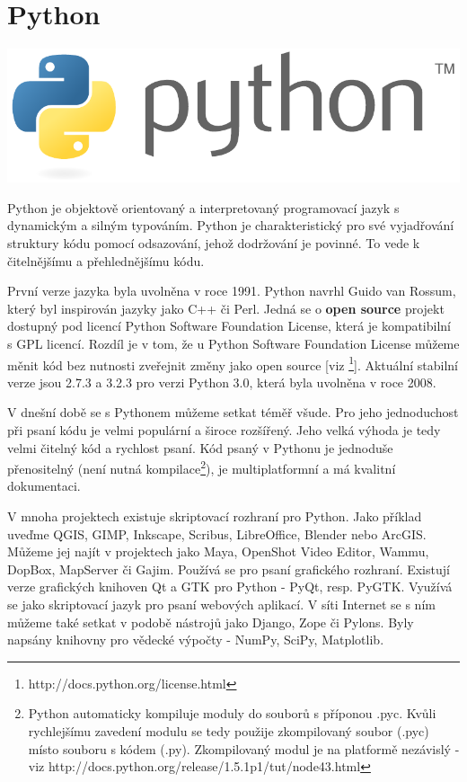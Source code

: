 \newpage
\section{Python}
\nocite{py3:book}


\begin{center}
	\includegraphics[scale=0.5]{pictures/python/logo.pdf}
\end{center}

Python je objektově orientovaný a interpretovaný programovací jazyk s
dynamickým a silným typováním. Python je charakteristický pro své
vyjadřování struktury kódu pomocí odsazování, jehož dodržování je
povinné. To vede k čitelnějšímu a přehlednějšímu kódu.

První verze jazyka byla uvolněna v roce 1991. Python navrhl Guido van
Rossum, který byl inspirován jazyky jako C++ či Perl. Jedná se
o \textbf{open source} projekt dostupný pod licencí Python Software
Foundation License, která je kompatibilní s GPL licencí. Rozdíl je v
tom, že u Python Software Foundation License můžeme měnit kód bez
nutnosti zveřejnit změny jako open source
[viz \footnote{http://docs.python.org/license.html}]. Aktuální
stabilní verze jsou 2.7.3 a 3.2.3 pro verzi Python 3.0, která byla
uvolněna v roce 2008.



V dnešní době se s Pythonem můžeme setkat téměř všude. Pro jeho
jednoduchost při psaní kódu je velmi populární a široce
rozšířený. Jeho velká výhoda je tedy velmi čitelný kód a rychlost
psaní.
Kód psaný v Pythonu je jednoduše přenositelný (není nutná kompilace\footnote{Python
 automaticky kompiluje moduly do souborů s příponou .pyc. Kvůli rychlejšímu 
 zavedení modulu se tedy použije zkompilovaný soubor (.pyc) místo souboru
  s kódem (.py). Zkompilovaný modul je na platformě nezávislý - viz
  http://docs.python.org/release/1.5.1p1/tut/node43.html}), je 
   multiplatformní a má kvalitní dokumentaci. 

V mnoha projektech existuje skriptovací rozhraní pro Python. Jako
příklad uveďme QGIS, GIMP, Inkscape, Scribus, LibreOffice, Blender
nebo ArcGIS. Můžeme jej najít v projektech jako Maya, OpenShot Video
Editor, Wammu, DopBox, MapServer či Gajim. Používá se pro psaní
grafického rozhraní. Existují verze grafických knihoven Qt a GTK pro
Python - PyQt, resp. PyGTK. Využívá se jako skriptovací jazyk pro
psaní webových aplikací. V síti Internet se s ním můžeme také setkat v
podobě nástrojů jako Django, Zope či Pylons. Byly napsány knihovny pro
vědecké výpočty - NumPy, SciPy, Matplotlib.

